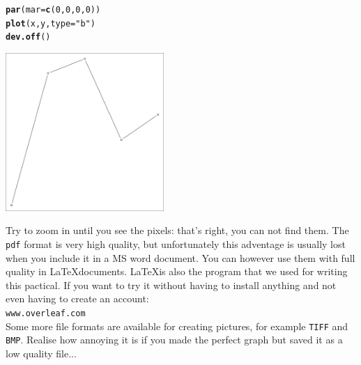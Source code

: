 \documentclass[12pt,a4paper]{article}\usepackage[]{graphicx}\usepackage[]{color}
\makeatletter
\newcommand{\hlnum}[1]{\textcolor[rgb]{0.686,0.059,0.569}{#1}}%
\newcommand{\hlstr}[1]{\textcolor[rgb]{0.192,0.494,0.8}{#1}}%
\newcommand{\hlstd}[1]{\textcolor[rgb]{0.345,0.345,0.345}{#1}}%
\newcommand{\hlkwc}[1]{\textcolor[rgb]{0.333,0.667,0.333}{#1}}%
\newcommand{\hlkwd}[1]{\textcolor[rgb]{0.737,0.353,0.396}{\textbf{#1}}}%
\newenvironment{kframe}{%
 \def\at@end@of@kframe{}%
 \ifinner\ifhmode%
  \def\at@end@of@kframe{\end{minipage}}%
  \begin{minipage}{\columnwidth}%
 \fi\fi%
 \def\FrameCommand##1{\hskip\@totalleftmargin \hskip-\fboxsep
 \colorbox{shadecolor}{##1}\hskip-\fboxsep
     \hskip-\linewidth \hskip-\@totalleftmargin \hskip\columnwidth}%
 \MakeFramed {\advance\hsize-\width
   \@totalleftmargin\z@ \linewidth\hsize
   \@setminipage}}%
 {\par\unskip\endMakeFramed%
 \at@end@of@kframe}
\newenvironment{knitrout}{}{} %
\makeatother
\begin{document}
\begin{mdframed}
\begin{knitrout}
\begin{kframe}
\begin{alltt}
\hlkwd{par}\hlstd{(}\hlkwc{mar}\hlstd{=}\hlkwd{c}\hlstd{(}\hlnum{0}\hlstd{,}\hlnum{0}\hlstd{,}\hlnum{0}\hlstd{,}\hlnum{0}\hlstd{))}
\hlkwd{plot}\hlstd{(x,y,}\hlkwc{type}\hlstd{=}\hlstr{"b"}\hlstd{)}
\hlkwd{dev.off}\hlstd{()}
\end{alltt}
\end{kframe}
\end{knitrout}
\begin{center}
\includegraphics[width=0.45\textwidth]{pdf1.pdf}
\end{center}
Try to zoom in until you see the pixels: that's right, you can not find them. The \texttt{pdf} format is very high quality, but unfortunately this adventage is usually lost when you include it in a MS word document. You can however use them with full quality in \LaTeX documents. \LaTeX is also the program that we used for writing this pactical. If you want to try it without having to install anything and not even having to create an account:\\
\texttt{www.overleaf.com} \\
Some more file formats are available for creating pictures, for example \texttt{TIFF} and \texttt{BMP}. Realise how annoying it is if you made the perfect graph but saved it as a low quality file...
\end{mdframed}
\end{document}
